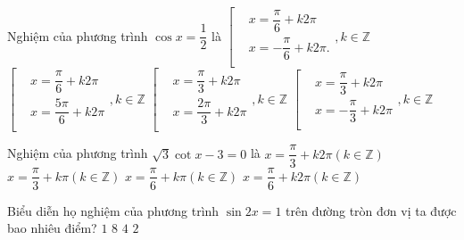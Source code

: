\begin{ex}%
	Nghiệm của phương trình $\cos x=\dfrac{1}{2}$  là
	\choice 
		{\True $\left[\begin{aligned}
		 & x=\dfrac{\pi }{6}+k2\pi \\
		& x=-\dfrac{\pi }{6}+k2\pi . \\ 
\end{aligned} \right.,k\in \mathbb{Z}$}
{$\left[\begin{aligned}
 & x=\dfrac{\pi }{6}+k2\pi \\
 & x=\dfrac{5\pi }{6}+k2\pi \\
\end{aligned} \right.,k\in \mathbb{Z}$}
{$\left[\begin{aligned}
&  x=\dfrac{\pi }{3}+k2\pi \\
&  x=\dfrac{2\pi }{3}+k2\pi \\
\end{aligned} \right.,k\in \mathbb{Z}$}
{$\left[\begin{aligned}
& x=\dfrac{\pi }{3}+k2\pi  \\
& x=-\dfrac{\pi }{3}+k2\pi \\ 
\end{aligned} \right.,k\in \mathbb{Z}$}
\loigiai{ 
	Ta có $\cos x=\dfrac{1}{2}\Leftrightarrow \cos x=\cos \dfrac{\pi }{6}\Leftrightarrow \left[\begin{aligned}
	& x=\dfrac{\pi }{6}+k2\pi \\ 
	& x=-\dfrac{\pi  }{6}+k2\pi \\
	\end{aligned} \right.,k\in \mathbb{Z}$.
} 
\end{ex}

\begin{ex}%
	Nghiệm  của phương trình $\sqrt{3}\cot x-3=0$ là
	\choice 
		{$x=\dfrac{\pi  }{3}+k2\pi \left( k\in \mathbb{Z} \right)$}
		{$x=\dfrac{\pi }{3}+k\pi \left( k\in \mathbb{Z}  \right)$}
		{\True $x=\dfrac{\pi }{6}+k\pi  \left( k\in \mathbb{Z} \right)$}
		{$x=\dfrac{\pi }{6}+k2\pi \left( k\in \mathbb{Z} \right)$} 
\end{ex}

\begin{ex}%
	Biểu diễn  họ nghiệm của phương trình $\sin2x=1$ trên đường tròn đơn vị ta được bao nhiêu điểm?
	 \choice
		 {$1$}
		 {$8$}
		 {$4$}
		{\True  $2$}
\end{ex}

